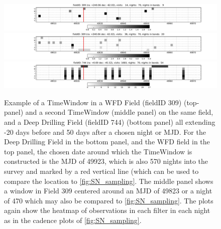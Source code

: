 \begin{center}
\begin{figure}
 \includegraphics[width=\textwidth]{figs/supernova/TimeWindow_309_49923.pdf}
 \includegraphics[width=\textwidth]{figs/supernova/TimeWindow_309_49823.pdf}
 \includegraphics[width=\textwidth]{figs/supernova/TimeWindow_744_49923.pdf}
 \label{fig:TimeWindow}
 \caption{Example of a TimeWindow in a WFD Field (fieldID 309)
 (top-panel) and a second TimeWindow (middle panel) on the same field,
 and a Deep Drilling Field (fieldID 744) (bottom panel) all extending
 -20 days before and 50 days after a chosen night or MJD. For the Deep
 Drilling Field in the bottom panel, and the WFD field in the top
 panel, the chosen date around which the TimeWindow is constructed is
 the MJD of 49923, which is also 570 nights into the survey and marked
 by a red vertical line (which can be used to compare the location to
 \autoref{fig:SN_sampling}. The middle panel shows a window in Field
 309 centered around an MJD of 49823 or a night of 470 which may also be
 compared to \autoref{fig:SN_sampling}. The plots again show the
 heatmap of observations in each filter in each night as in the cadence
 plots of \autoref{fig:SN_sampling}.}
\end{figure}
 \end{center}


